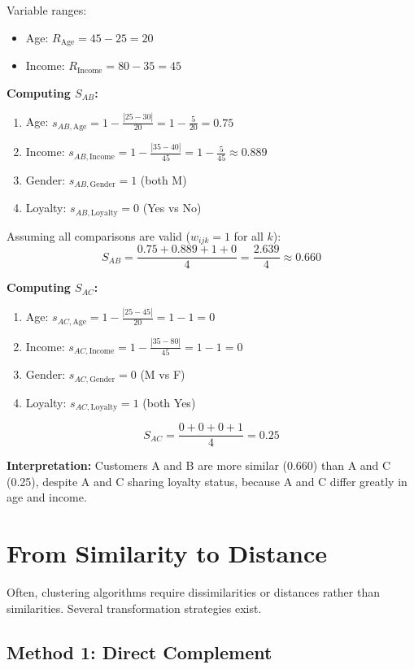 \documentclass[11pt]{article}
\begin{document}
Variable ranges:
\begin{itemize}
    \item Age: $R_{\text{Age}} = 45 - 25 = 20$
    \item Income: $R_{\text{Income}} = 80 - 35 = 45$
\end{itemize}

\textbf{Computing $S_{AB}$:}

\begin{enumerate}
    \item Age: $s_{AB,\text{Age}} = 1 - \frac{|25-30|}{20} = 1 - \frac{5}{20} = 0.75$
    \item Income: $s_{AB,\text{Income}} = 1 - \frac{|35-40|}{45} = 1 - \frac{5}{45} \approx 0.889$
    \item Gender: $s_{AB,\text{Gender}} = 1$ (both M)
    \item Loyalty: $s_{AB,\text{Loyalty}} = 0$ (Yes vs No)
\end{enumerate}

Assuming all comparisons are valid ($w_{ijk} = 1$ for all $k$):
$$S_{AB} = \frac{0.75 + 0.889 + 1 + 0}{4} = \frac{2.639}{4} \approx 0.660$$

\textbf{Computing $S_{AC}$:}

\begin{enumerate}
    \item Age: $s_{AC,\text{Age}} = 1 - \frac{|25-45|}{20} = 1 - 1 = 0$
    \item Income: $s_{AC,\text{Income}} = 1 - \frac{|35-80|}{45} = 1 - 1 = 0$
    \item Gender: $s_{AC,\text{Gender}} = 0$ (M vs F)
    \item Loyalty: $s_{AC,\text{Loyalty}} = 1$ (both Yes)
\end{enumerate}

$$S_{AC} = \frac{0 + 0 + 0 + 1}{4} = 0.25$$

\textbf{Interpretation:} Customers A and B are more similar (0.660) than A and C (0.25), despite A and C sharing loyalty status, because A and C differ greatly in age and income.

\section{From Similarity to Distance}

Often, clustering algorithms require dissimilarities or distances rather than similarities. Several transformation strategies exist.

\subsection{Method 1: Direct Complement}
\end{document}
